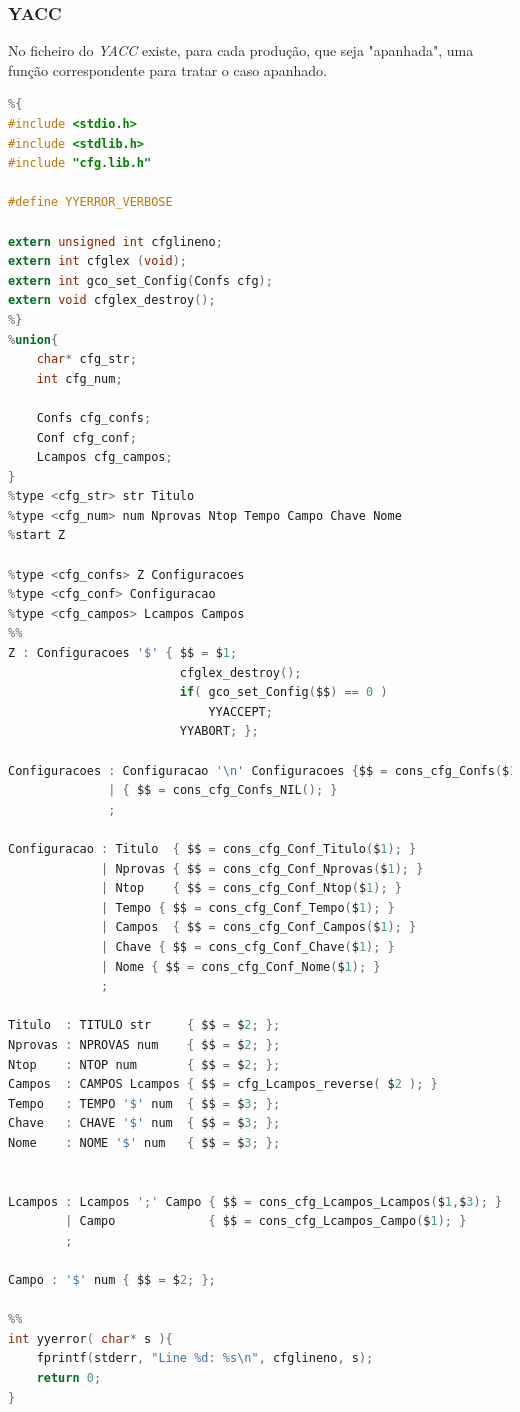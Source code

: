 \documentclass[11pt, a4paper, oneside]{article}
\begin{document}
\newpage
\subsubsection{YACC}
No ficheiro do \textit{YACC} existe, para cada produção, que seja "apanhada", uma função correspondente para tratar o caso apanhado.

\begin{lstlisting}[language=C, caption={YACC do ficheiro de configuração.}]
%token TITULO NPROVAS NTOP CAMPOS TEMPO CHAVE NOME str num
%{
#include <stdio.h>
#include <stdlib.h>
#include "cfg.lib.h"

#define YYERROR_VERBOSE

extern unsigned int cfglineno;
extern int cfglex (void);
extern int gco_set_Config(Confs cfg);
extern void cfglex_destroy();
%}
%union{
    char* cfg_str;
    int cfg_num;
    
    Confs cfg_confs;
    Conf cfg_conf;
    Lcampos cfg_campos;
}
%type <cfg_str> str Titulo
%type <cfg_num> num Nprovas Ntop Tempo Campo Chave Nome
%start Z

%type <cfg_confs> Z Configuracoes
%type <cfg_conf> Configuracao
%type <cfg_campos> Lcampos Campos
%%
Z : Configuracoes '$' { $$ = $1;
                        cfglex_destroy();
                        if( gco_set_Config($$) == 0 )
                            YYACCEPT;
                        YYABORT; };

Configuracoes : Configuracao '\n' Configuracoes {$$ = cons_cfg_Confs($1,$3);}
              | { $$ = cons_cfg_Confs_NIL(); }
              ;

Configuracao : Titulo  { $$ = cons_cfg_Conf_Titulo($1); }
             | Nprovas { $$ = cons_cfg_Conf_Nprovas($1); }
             | Ntop    { $$ = cons_cfg_Conf_Ntop($1); }
             | Tempo { $$ = cons_cfg_Conf_Tempo($1); }
             | Campos  { $$ = cons_cfg_Conf_Campos($1); }
             | Chave { $$ = cons_cfg_Conf_Chave($1); }
             | Nome { $$ = cons_cfg_Conf_Nome($1); }
             ;

Titulo  : TITULO str     { $$ = $2; };
Nprovas : NPROVAS num    { $$ = $2; };
Ntop    : NTOP num       { $$ = $2; };
Campos  : CAMPOS Lcampos { $$ = cfg_Lcampos_reverse( $2 ); }
Tempo   : TEMPO '$' num  { $$ = $3; };
Chave   : CHAVE '$' num  { $$ = $3; };
Nome    : NOME '$' num   { $$ = $3; };


Lcampos : Lcampos ';' Campo { $$ = cons_cfg_Lcampos_Lcampos($1,$3); }
        | Campo             { $$ = cons_cfg_Lcampos_Campo($1); }
        ;

Campo : '$' num { $$ = $2; };

%%
int yyerror( char* s ){
    fprintf(stderr, "Line %d: %s\n", cfglineno, s);
    return 0;
}
\end{lstlisting} 
\end{document}
